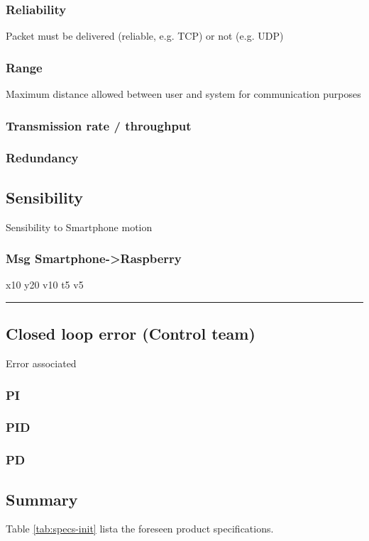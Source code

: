 \documentclass[11pt]{article}
\begin{document}
\subsubsection{Reliability}
\label{sec:orgdcb920d}
Packet must be delivered (reliable, e.g. TCP) or not (e.g. UDP)
\subsubsection{Range}
\label{sec:org447a205}
Maximum distance allowed between user and system for communication purposes
\subsubsection{Transmission rate / throughput}
\label{sec:org10e75a5}
\subsubsection{Redundancy}
\label{sec:orgc5933fc}
\subsection{Sensibility}
\label{sec:org622e63a}
Sensibility to Smartphone motion
\subsubsection{Msg Smartphone->Raspberry}
\label{sec:org6b5cb97}
x10 y20 v10
t5 v5

\noindent\rule{\textwidth}{0.5pt}
\subsection{Closed loop error (Control team)}
\label{sec:org436f732}
Error associated
\subsubsection{PI}
\label{sec:org9859444}
\subsubsection{PID}
\label{sec:org352c4d4}
\subsubsection{PD}
\label{sec:org0d324c4}

\subsection{Summary}
\label{sec:org1f95256}
Table \ref{tab:specs-init} lista the foreseen product specifications.
\end{document}
